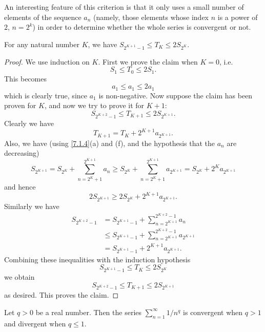 \begin{remark}\label{7.3.5}
  An interesting feature of this criterion is that it only uses a small number of elements of the sequence \(a_n\)
  (namely, those elements whose index \(n\) is a power of \(2\), \(n = 2^k\))
  in order to determine whether the whole series is convergent or not.
\end{remark}

\begin{lemma}\label{7.3.6}
  For any natural number \(K\), we have \(S_{2^{K + 1} - 1} \leq T_K \leq 2S_{2^K}\).
\end{lemma}

\begin{proof}
  We use induction on \(K\).
  First we prove the claim when \(K = 0\), i.e.
  \[
    S_1 \leq T_0 \leq 2S_1.
  \]
  This becomes
  \[
    a_1 \leq a_1 \leq 2a_1
  \]
  which is clearly true, since \(a_1\) is non-negative.
  Now suppose the claim has been proven for \(K\), and now we try to prove it for \(K + 1\):
  \[
    S_{2^{K + 2} - 1} \leq T_{K + 1} \leq 2S_{2^{K + 1}}.
  \]
  Clearly we have
  \[
    T_{K + 1} = T_K + 2^{K + 1} a_{2^{K + 1}}.
  \]
  Also, we have
  (using \cref{7.1.4}(a) and (f), and the hypothesis that the \(a_n\) are decreasing)
  \[
    S_{2^{K + 1}} = S_{2^K} + \sum_{n = 2^K + 1}^{2^{K + 1}} a_n \geq S_{2^K} + \sum_{n = 2^K + 1}^{2^{K + 1}} a_{2^{K + 1}} = S_{2^K} + 2^K a_{2^{K + 1}}
  \]
  and hence
  \[
    2S_{2^{K + 1}} \geq 2S_{2^K} + 2^{K + 1} a_{2^{K + 1}}.
  \]
  Similarly we have
  \begin{align*}
    S_{2^{K + 2} - 1} & = S_{2^{K + 1} - 1} + \sum_{n = 2^{K + 1}}^{2^{K + 2} - 1} a_n              \\
                      & \leq S_{2^{K + 1} - 1} + \sum_{n = 2^{K + 1}}^{2^{K + 2} - 1} a_{2^{K + 1}} \\
                      & = S_{2^{K + 1} - 1} + 2^{K + 1} a_{2^{K + 1}}.
  \end{align*}
  Combining these inequalities with the induction hypothesis
  \[
    S_{2^{K + 1} - 1} \leq T_K \leq 2S_{2^K}
  \]
  we obtain
  \[
    S_{2^{K + 2} - 1} \leq T_{K + 1} \leq 2S_{2^{K + 1}}
  \]
  as desired.
  This proves the claim.
\end{proof}

\begin{corollary}\label{7.3.7}
  Let \(q > 0\) be a real number.
  Then the series \(\sum_{n = 1}^\infty 1 / n^q\) is convergent when \(q > 1\) and divergent when \(q \leq 1\).
\end{corollary}

